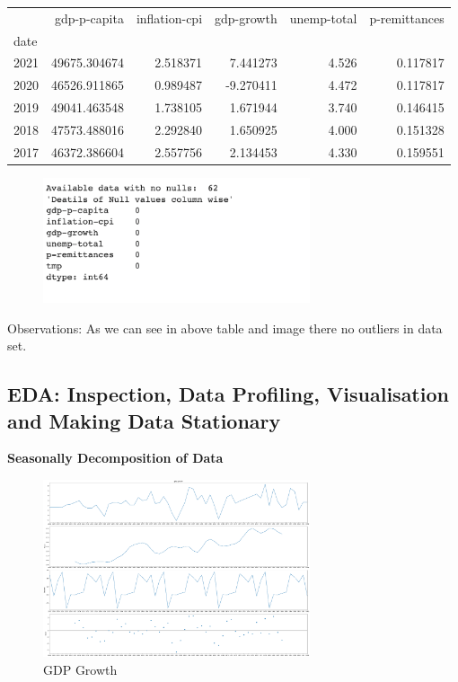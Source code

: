 \begin{tabular}{lrrrrr}
\toprule
{} &  gdp-p-capita &  inflation-cpi &  gdp-growth &  unemp-total &  p-remittances \\
date &               &                &             &              &                \\
\midrule
2021 &  49675.304674 &       2.518371 &    7.441273 &        4.526 &       0.117817 \\
2020 &  46526.911865 &       0.989487 &   -9.270411 &        4.472 &       0.117817 \\
2019 &  49041.463548 &       1.738105 &    1.671944 &        3.740 &       0.146415 \\
2018 &  47573.488016 &       2.292840 &    1.650925 &        4.000 &       0.151328 \\
2017 &  46372.386604 &       2.557756 &    2.134453 &        4.330 &       0.159551 \\
\bottomrule
\end{tabular}

\vspace{10mm}

\begin{figure}[H]
    \centering
    \includegraphics[width=0.7\textwidth]{Images/outlier_fix.png}
\end{figure}

Observations: As we can see in above table and image there no outliers in data set.


\vspace{50mm}

\subsection{EDA: Inspection, Data Profiling, Visualisation and Making Data Stationary  }

\textbf{Seasonally Decomposition of Data}\\

\begin{figure}[H]
    \centering
    \includegraphics[width=0.7\textwidth]{Images/gdp-growth_decompose.pdf}
    \caption{GDP Growth}
    \label{fig1}
\end{figure}

